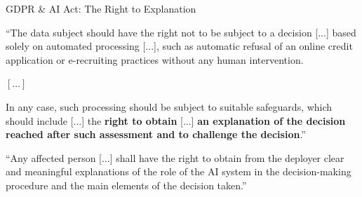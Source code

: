 \documentclass[10pt,compress,t,notes=noshow, xcolor=table]{beamer}
\begin{document}
\begin{frame}[t]{GDPR \& AI Act: The Right to Explanation}

``The data subject should have the right not to be subject to a decision
    [...] based solely on automated processing [...],
    such as automatic refusal of an online credit application or e-recruiting practices without any human intervention.

$[\ldots]$

In any case, such processing should be subject to suitable safeguards, which should include [...]
the \textbf{right to obtain} [...]
\textbf{an explanation of the decision reached after such assessment and to challenge the decision}.''
\hfill {}

\medskip

``Any affected person [...]
shall have the right to obtain from the deployer clear and meaningful explanations of the role of the AI system in the decision-making procedure and the main elements of the decision taken.''
\hfill {}
\end{frame}
\end{document}
